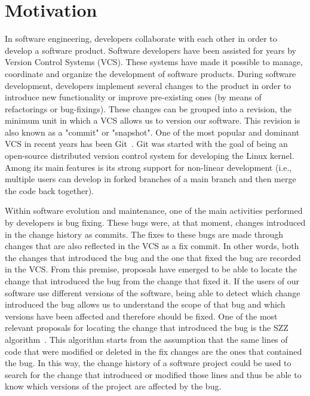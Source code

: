 \section{Motivation}

In software engineering, developers collaborate with each other in order to develop a software product. 
Software developers have been assisted for years by Version Control Systems (VCS). 
These systems have made it possible to manage, coordinate and organize the development of software products. 
During software development, developers implement several changes to the product in order to introduce new functionality or improve pre-existing ones (by means of refactorings or bug-fixings).
These changes can be grouped into a revision, the minimum unit in which a VCS allows us to version our software. 
This revision is also known as a "commit" or "snapshot".
One of the most popular and dominant VCS in recent years has been Git~\cite{VersionControlSystemSurvey:2022:Online}. 
Git was started with the goal of being an open-source distributed version control system for developing the Linux kernel.
Among its main features is its strong support for non-linear development (i.e., multiple users can develop in forked branches of a main branch and then merge the code back together).

Within software evolution and maintenance, one of the main activities performed by developers is bug fixing. 
These bugs were, at that moment, changes introduced in the change history as commits.
The fixes to these bugs are made through changes that are also reflected in the VCS as a fix commit. 
In other words, both the changes that introduced the bug and the one that fixed the bug are recorded in the VCS. 
From this premise, proposals have emerged to be able to locate the change that introduced the bug from the change that fixed it. 
If the users of our software use different versions of the software, being able to detect which change introduced the bug allows us to understand the scope of that bug and which versions have been affected and therefore should be fixed.
One of the most relevant proposals for locating the change that introduced the bug is the SZZ algorithm~\cite{Sliwerski:2005:CIF:1083142.1083147}. 
This algorithm starts from the assumption that the same lines of code that were modified or deleted in the fix changes are the ones that contained the bug. 
In this way, the change history of a software project could be used to search for the change that introduced or modified those lines and thus be able to know which versions of the project are affected by the bug.

